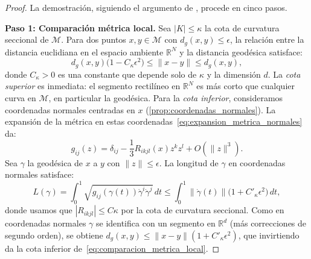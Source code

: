\begin{proof}
	La demostración, siguiendo el argumento de \citet{bernstein2000graph}, procede en cinco pasos.

	\textbf{Paso 1: Comparación métrica local.}
	Sea $|K| \leq \kappa$ la cota de curvatura seccional de $\mathcal{M}$. Para dos puntos $x, y \in \mathcal{M}$ con $d_g(x, y) \leq \epsilon$, la relación entre la distancia euclidiana en el espacio ambiente $\mathbb{R}^N$ y la distancia geodésica satisface:
	\begin{equation}\label{eq:comparacion_metrica_local}
	d_g(x,y)\bigl(1 - C_\kappa \epsilon^2\bigr) \leq \|x - y\| \leq d_g(x,y),
	\end{equation}
	donde $C_\kappa > 0$ es una constante que depende solo de $\kappa$ y la dimensión $d$. La \emph{cota superior} es inmediata: el segmento rectilíneo en $\mathbb{R}^N$ es más corto que cualquier curva en $\mathcal{M}$, en particular la geodésica. Para la \emph{cota inferior}, consideramos coordenadas normales centradas en $x$ (\autoref{prop:coordenadas_normales}). La expansión de la métrica en estas coordenadas~\eqref{eq:expansion_metrica_normales} da:
	\[
	g_{ij}(z) = \delta_{ij} - \frac{1}{3} R_{ikjl}(x) z^k z^l + O(\|z\|^3).
	\]
	Sea $\gamma$ la geodésica de $x$ a $y$ con $\|z\| \leq \epsilon$. La longitud de $\gamma$ en coordenadas normales satisface:
	\[
	L(\gamma) = \int_0^1 \sqrt{g_{ij}(\gamma(t))\dot{\gamma}^i\dot{\gamma}^j} \, dt \leq \int_0^1 \|\dot{\gamma}(t)\|\bigl(1 + C'_\kappa \epsilon^2\bigr) \, dt,
	\]
	donde usamos que $|R_{ikjl}| \leq C\kappa$ por la cota de curvatura seccional. Como en coordenadas normales $\gamma$ se identifica con un segmento en $\mathbb{R}^d$ (más correcciones de segundo orden), se obtiene $d_g(x,y) \leq \|x - y\|(1 + C'_\kappa \epsilon^2)$, que invirtiendo da la cota inferior de~\eqref{eq:comparacion_metrica_local}.


\end{proof}
